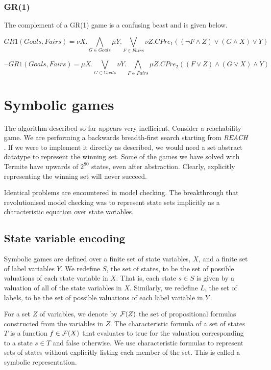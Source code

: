 \subsubsection{GR(1)}

The complement of a GR(1) game is a confusing beast and is given below.

\begin{equation}
    GR1(Goals, Fairs) = \nu X. \bigwedge_{G \in Goals} \mu Y. \bigvee_{F \in Fairs} \nu Z. CPre_1((\neg F \wedge Z) \vee (G \wedge X) \vee Y)
\end{equation}

\begin{equation}
    \neg GR1(Goals, Fairs) = \mu X. \bigvee_{G \in Goals} \nu Y. \bigwedge_{F \in Fairs} \mu Z. CPre_2((F \vee Z) \wedge (G \vee X) \wedge Y)
\end{equation}

\section{Symbolic games}

The algorithm described so far appears very inefficient. Consider a reachability game. We are performing a backwards breadth-first search starting from $\mathit{REACH}$. If we were to implement it directly as described, we would need a set abstract datatype to represent the winning set. Some of the games we have solved with Termite have upwards of $2^{80}$ states, even after abstraction. Clearly, explicitly representing the winning set will never succeed. 

Identical problems are encountered in model checking. The breakthrough that revolutionised model checking was to represent state sets implicitly as a characteristic equation over state variables.

\subsection{State variable encoding}

Symbolic games are defined over a finite set of state variables, $X$, and a finite set of label variables $Y$. We redefine $S$, the set of states, to be the set of possible valuations of each state variable in $X$. That is, each state $s \in S$ is given by a valuation of all of the state variables in $X$. Similarly, we redefine $L$, the set of labels, to be the set of possible valuations of each label variable in $Y$.

For a set $Z$ of variables, we denote by $\mathcal{F}(Z)$ the set of propositional formulas constructed from the variables in $Z$. The characteristic formula of a set of states $T$ is a function $f \in \mathcal{F}(X)$ that evaluates to true for the valuation corresponding to a state $s \in T$ and false otherwise. We use characteristic formulas to represent sets of states without explicitly listing each member of the set. This is called a symbolic representation.

